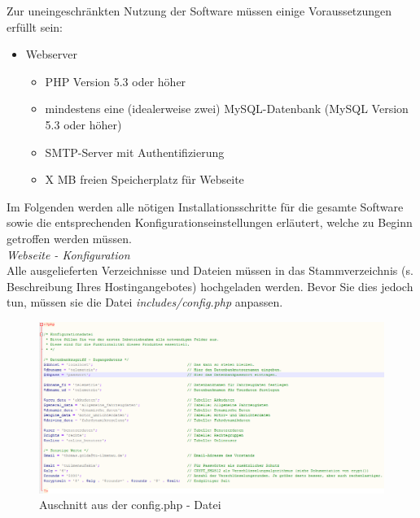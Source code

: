 \documentclass[fontsize = 12pt, paper = a4]{scrreprt}
\begin{document}
Zur uneingeschränkten Nutzung der Software müssen einige Voraussetzungen erfüllt sein: 

\begin{itemize}

\item Webserver 

\begin{itemize}

\item PHP Version 5.3 oder höher
\item mindestens eine (idealerweise zwei) MySQL-Datenbank (MySQL Version 5.3 oder höher)
\item SMTP-Server mit Authentifizierung
\item X MB freien Speicherplatz für Webseite

\end{itemize}

\end{itemize}

Im Folgenden werden alle nötigen Installationsschritte für die gesamte Software sowie die entsprechenden Konfigurationseinstellungen erläutert, welche zu Beginn getroffen werden müssen. \\

\textit{Webseite - Konfiguration} \\

Alle ausgelieferten Verzeichnisse und Dateien müssen in das Stammverzeichnis (s. Beschreibung Ihres Hostingangebotes) hochgeladen werden. Bevor Sie dies jedoch tun, müssen sie die Datei \textit{includes/config.php} anpassen. \\ 

\begin{figure}[h]
\centering
\includegraphics[scale = 0.50]{website_config}
\caption[Auschnitt aus der config.php - Datei]{Auschnitt aus der config.php - Datei}
\label{websiteconfig}
\end{figure} 
\end{document}
